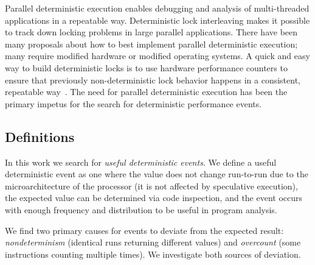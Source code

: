 Parallel deterministic execution enables debugging and analysis of 
multi-threaded applications in a repeatable way.  
Deterministic lock interleaving makes it possible to track down 
locking problems in large parallel applications.
There have been many proposals about how to best implement parallel
deterministic execution; many require modified hardware or modified
operating systems.  A quick and easy way to build deterministic
locks is to use hardware performance counters to ensure that
previously non-deterministic lock behavior happens
in a consistent, repeatable 
way~\cite{olszewski+:asplos09,yun:code2010,aviram+:osdi10,bergan+:osdi10}.
The need for parallel deterministic execution has been the primary
impetus for the search for deterministic performance events.

\subsection{Definitions}

In this work we search for {\em useful deterministic events}.
We define a useful deterministic event as one where the value
does not change run-to-run due to the microarchitecture of the 
processor (it is not affected by speculative execution),
the expected value can be determined via code inspection, and
the event occurs with enough frequency and distribution 
to be useful in program analysis.

We find two primary causes for events to deviate from the expected
result:
{\em nondeterminism} (identical runs returning different values) 
and {\em overcount} (some instructions counting multiple times).  
We investigate both sources of deviation.
